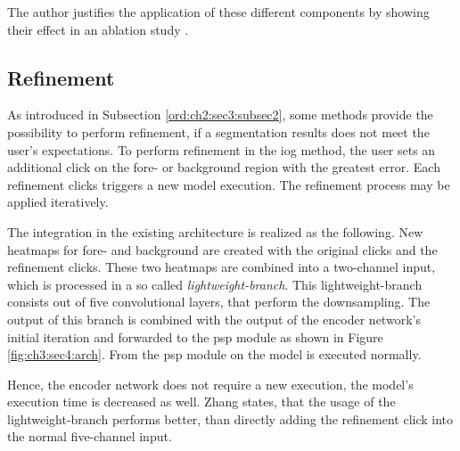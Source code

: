 The author justifies the application of these different components by showing their effect in an ablation study \cite{Zha20-IOG}.


\subsection{Refinement}\label{ord:ch3:sec4:subsec4}

As introduced in Subsection \ref{ord:ch2:sec3:subsec2}, some methods provide the possibility to perform refinement, if a segmentation results does not meet the user's expectations.
To perform refinement in the \gls{iog} method, the user sets an additional click on the fore- or background region with the greatest error.
Each refinement clicks triggers a new model execution.
The refinement process may be applied iteratively.

The integration in the existing architecture is realized as the following.
New heatmaps for fore- and background are created with the original clicks and the refinement clicks.
These two heatmaps are combined into a two-channel input, which is processed in a so called \textit{lightweight-branch}.
This lightweight-branch consists out of five convolutional layers, that perform the downsampling.
The output of this branch is combined with the output of the encoder network's initial iteration and forwarded to the \gls{psp} module as shown in Figure \ref{fig:ch3:sec4:arch}.
From the \gls{psp} module on the model is executed normally.

Hence, the encoder network does not require a new execution, the model's execution time is decreased as well.
Zhang states, that the usage of the lightweight-branch performs better, than directly adding the refinement click into the normal five-channel input.


